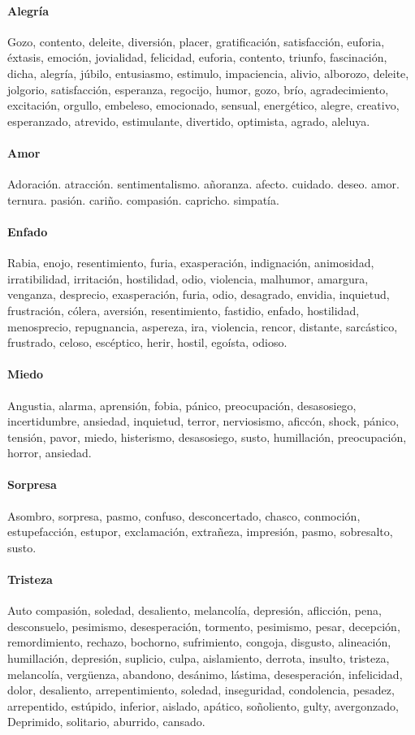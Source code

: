 \documentclass[../all.tex]{subfiles}
\begin{document}
    \paragraph{Alegría}
    Gozo, contento, deleite, diversión, placer, gratificación, satisfacción, euforia, éxtasis, emoción, jovialidad, felicidad, euforia, contento, triunfo, fascinación, dicha, alegría, júbilo, entusiasmo, estimulo, impaciencia, alivio, alborozo, deleite, jolgorio, satisfacción, esperanza, regocijo, humor, gozo, brío, agradecimiento, excitación, orgullo, embeleso, emocionado, sensual, energético, alegre, creativo, esperanzado, atrevido, estimulante, divertido, optimista, agrado, aleluya.
    \paragraph{Amor}
    Adoración. atracción. sentimentalismo. añoranza. afecto. cuidado. deseo. amor. ternura. pasión. cariño. compasión. capricho. simpatía.
    \paragraph{Enfado}
    Rabia, enojo, resentimiento, furia, exasperación, indignación, animosidad, irratibilidad, irritación, hostilidad, odio, violencia, malhumor, amargura, venganza, desprecio, exasperación, furia, odio, desagrado, envidia, inquietud, frustración, cólera, aversión, resentimiento, fastidio, enfado, hostilidad, menosprecio, repugnancia, aspereza, ira, violencia, rencor, distante, sarcástico, frustrado, celoso, escéptico, herir, hostil, egoísta, odioso.
    \paragraph{Miedo}
    Angustia, alarma, aprensión, fobia, pánico, preocupación, desasosiego, incertidumbre, ansiedad, inquietud, terror, nerviosismo, aficcón, shock, pánico, tensión, pavor, miedo, histerismo, desasosiego, susto, humillación, preocupación, horror, ansiedad.
    \paragraph{Sorpresa}
    Asombro, sorpresa, pasmo, confuso, desconcertado, chasco, conmoción, estupefacción, estupor, exclamación, extrañeza, impresión, pasmo, sobresalto, susto.
    \paragraph{Tristeza}
    Auto compasión, soledad, desaliento, melancolía, depresión, aflicción, pena, desconsuelo, pesimismo, desesperación, tormento, pesimismo, pesar, decepción, remordimiento, rechazo, bochorno, sufrimiento, congoja, disgusto, alineación, humillación, depresión, suplicio, culpa, aislamiento, derrota, insulto, tristeza, melancolía, vergüenza, abandono, desánimo, lástima, desesperación, infelicidad, dolor, desaliento, arrepentimiento, soledad, inseguridad, condolencia, pesadez, arrepentido, estúpido, inferior, aislado, apático, soñoliento, gulty, avergonzado, Deprimido, solitario, aburrido, cansado.
\end{document}
